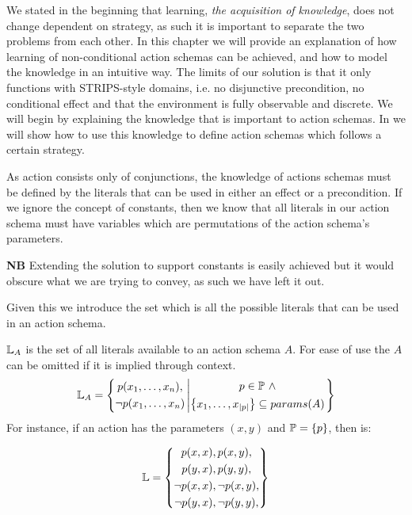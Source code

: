 \documentclass[Master.tex]{subfiles}
\begin{document}
We stated in the beginning that learning, \emph{the acquisition of knowledge}, does not change dependent on strategy, as such it is important to separate the two problems from each other.
In this chapter we will provide an explanation of how learning of non-conditional action schemas can be achieved, and how to model the knowledge in an intuitive way.
The limits of our solution is that it only functions with STRIPS-style domains, i.e.  no disjunctive precondition, no conditional effect and that the environment is fully observable and discrete.
We will begin by explaining the knowledge that is important to action schemas. 
In  we will show how to use this knowledge to define action schemas which follows a certain strategy.


As action consists only of conjunctions, the knowledge of actions schemas must be defined by the literals that can be used in either an effect or a precondition.
If we ignore the concept of constants, then we know that all literals in our action schema must have variables which are permutations of the  action schema's parameters.

\textbf{NB} Extending the solution to support constants is easily achieved but it would obscure what we are trying to convey, as such we have left it out.
 
Given this we introduce the set \lits which is all the possible literals that can be used in an action schema.

\begin{definition} 
	$\mathbb{L}_A$ is the set of all literals available to an action schema $A$. For ease of use the $A$ can be omitted if it is implied through context.
	\begin{equation*}
	\mathbb{L}_A = \left\{ 
	\begin{gathered}
	p(x_1,\dots,x_n), \\
	\neg p(x_1,\dots,x_n)
	\end{gathered}
	\left|
	\begin{gathered} p \in \mathbb{P}~\land \\
	\left\{ x_1,\dots,x_{|p|} \right\} \subseteq params(A)
	\end{gathered}				
	\right.\right\}
	\end{equation*}
	For instance, if an action has the parameters $(x,y)$ and $\mathbb{P} = \{ p \}$, then \lits is:
	
	\begin{equation*}
		\mathbb{L} = \left\{
		\begin{gathered}
			p(x,x), 
			p(x,y), \\
			p(y,x), 
			p(y,y), \\
	\neg	p(x,x), 
	\neg	p(x,y), \\
	\neg	p(y,x), 
	\neg	p(y,y),
		\end{gathered}
		\right\}
	\end{equation*}
	
\end{definition}
\end{document}
